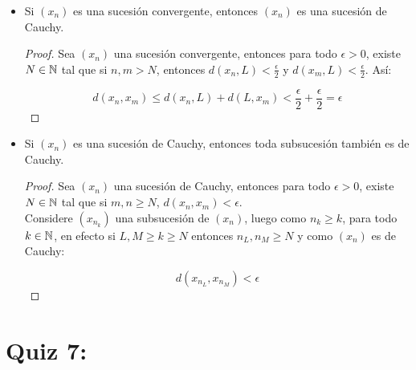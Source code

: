 \begin{itemize}[label={✎},leftmargin=*]
    \item Si $(x_n)$ es una sucesión convergente, entonces $(x_n)$ es una sucesión de Cauchy.

    \begin{proof}
    Sea $(x_n)$ una sucesión convergente, entonces para todo $\epsilon>0$, existe $N\in \mathbb{N}$ tal que si $n,m>N$, entonces $d(x_n,L)<\frac{\epsilon}{2}$ y $d(x_m,L)<\frac{\epsilon}{2}$. Así:

    $$d(x_n,x_m)\leq d(x_n,L)+d(L,x_m)<\frac{\epsilon}{2}+\frac{\epsilon}{2}=\epsilon$$
    \end{proof}

    \item Si $(x_n)$ es una sucesión de Cauchy, entonces toda subsucesión también es de Cauchy.

    \begin{proof}
        Sea $(x_n)$ una sucesión de Cauchy, entonces para todo $\epsilon>0$, existe $N\in \mathbb{N}$ tal que si $m,n\geq N$, $d(x_n,x_m)<\epsilon$.\\

        Considere $(x_{n_k})$ una subsucesión de $(x_n)$, luego como $n_k\geq k$, para todo $k\in \mathbb{N}$, en efecto si $L,M\geq k\geq N$ entonces $n_L,n_M\geq N$ y como $(x_n)$ es de Cauchy:

        $$d(x_{n_L},x_{n_M})<\epsilon$$ 
    \end{proof}
\end{itemize}

\section{Quiz 7:}

